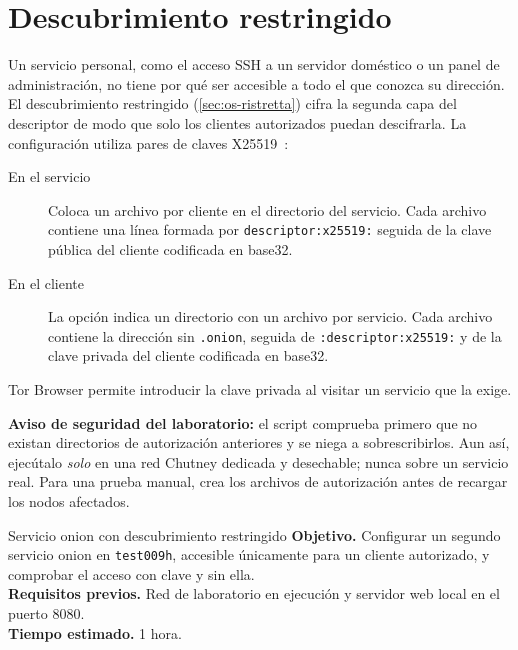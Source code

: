 \section{Descubrimiento restringido}\label{sec:onionp-ristretta}

Un servicio personal, como el acceso SSH a un servidor doméstico o un panel de administración, no tiene por qué ser accesible a todo el que conozca su dirección. El descubrimiento restringido (\cref{sec:os-ristretta}) cifra la segunda capa del descriptor de modo que solo los clientes autorizados puedan descifrarla. La configuración utiliza pares de claves X25519~\cite{torspec}:
\begin{description}
  \item[En el servicio] Coloca un archivo  por cliente en el directorio  del servicio. Cada archivo contiene una línea formada por \texttt{descriptor:\allowbreak x25519:} seguida de la clave pública del cliente codificada en base32.
  \item[En el cliente] La opción  indica un directorio con un archivo  por servicio. Cada archivo contiene la dirección sin \texttt{.onion}, seguida de \texttt{:\allowbreak descriptor:\allowbreak x25519:} y de la clave privada del cliente codificada en base32.
\end{description}
Tor Browser permite introducir la clave privada al visitar un servicio que la exige.

\textbf{Aviso de seguridad del laboratorio:} el script  comprueba primero que no existan directorios de autorización anteriores y se niega a sobrescribirlos. Aun así, ejecútalo \emph{solo} en una red Chutney dedicada y desechable; nunca sobre un servicio real. Para una prueba manual, crea los archivos de autorización antes de recargar los nodos afectados.

\begin{laboratorio}[13]{Servicio onion con descubrimiento restringido}
\textbf{Objetivo.} Configurar un segundo servicio onion en \texttt{test009h}, accesible únicamente para un cliente autorizado, y comprobar el acceso con clave y sin ella.\\
\textbf{Requisitos previos.} Red de laboratorio en ejecución y servidor web local en el puerto 8080.\\
\textbf{Tiempo estimado.} 1 hora.
\end{laboratorio}

